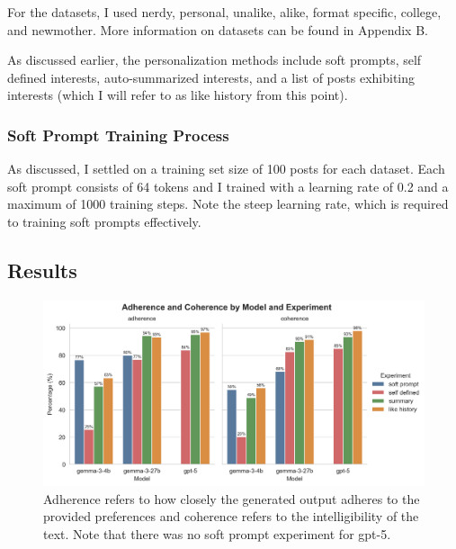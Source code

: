 \documentclass[11pt]{article}
\begin{document}
For the datasets, I used nerdy, personal, unalike, alike, format specific, college, and newmother. More information on datasets can be found in Appendix B.

As discussed earlier, the personalization methods include soft prompts, self defined interests, auto-summarized interests, and a list of posts exhibiting interests (which I will refer to as like history from this point).

\subsubsection*{Soft Prompt Training Process}

As discussed, I settled on a training set size of 100 posts for each dataset. Each soft prompt consists of 64 tokens and I trained with a learning rate of 0.2 and a maximum of 1000 training steps. Note the steep learning rate, which is required to training soft prompts effectively.

\subsection{Results}

\begin{figure}[t!]
    \centering
    \includegraphics[width=\linewidth]{visuals/acu-by-model-experiment.png}
    \caption{Adherence refers to how closely the generated output adheres to the provided preferences and coherence refers to the intelligibility of the text. Note that there was no soft prompt experiment for gpt-5.}
    \label{fig:acu-rates}
    \end{figure}
\end{document}
